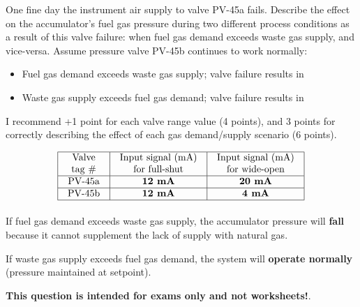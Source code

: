 One fine day the instrument air supply to valve PV-45a fails.  Describe the effect on the accumulator's fuel gas pressure during two different process conditions as a result of this valve failure: when fuel gas demand exceeds waste gas supply, and vice-versa.  Assume pressure valve PV-45b continues to work normally:

\begin{itemize}
\item{} Fuel gas demand exceeds waste gas supply; valve failure results in \underbar{\hskip 100pt}
\vskip 5pt 
\item{} Waste gas supply exceeds fuel gas demand; valve failure results in \underbar{\hskip 100pt}
\end{itemize}







I recommend +1 point for each valve range value (4 points), and 3 points for correctly describing the effect of each gas demand/supply scenario (6 points).


$$\vbox{\offinterlineskip
\halign{\strut
\vrule \quad\hfil # \ \hfil & 
\vrule \quad\hfil # \ \hfil & 
\vrule \quad\hfil # \ \hfil \vrule \cr
\noalign{\hrule}
%
Valve & Input signal (mA) & Input signal (mA) \cr
%
tag \# & for full-shut & for wide-open \cr
%
\noalign{\hrule}
%
PV-45a & {\bf 12 mA} & {\bf 20 mA} \cr
%
\noalign{\hrule}
%
PV-45b & {\bf 12 mA} & {\bf 4 mA} \cr
%
\noalign{\hrule}
} %
}$$ %

If fuel gas demand exceeds waste gas supply, the accumulator pressure will {\bf fall} because it cannot supplement the lack of supply with natural gas.

\vskip 10pt

If waste gas supply exceeds fuel gas demand, the system will {\bf operate normally} (pressure maintained at setpoint).







{\bf This question is intended for exams only and not worksheets!}.



